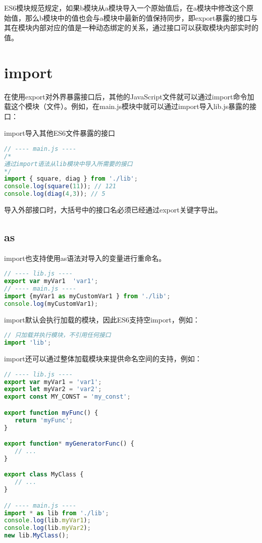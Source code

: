 ES6模块规范规定，如果b模块从a模块导入一个原始值后，在a模块中修改这个原始值，那么b模块中的值也会与a模块中最新的值保持同步，即export暴露的接口与其在模块内部对应的值是一种动态绑定的关系，通过接口可以获取模块内部实时的值。


\section{import}

在使用export对外界暴露接口后，其他的JavaScript文件就可以通过import命令加载这个模块（文件）。例如，在main.js模块中就可以通过import导入lib.js暴露的接口：


\begin{example}
import导入其他ES6文件暴露的接口
\begin{lstlisting}[language=JavaScript]
// ---- main.js ----
/* 
通过import语法从lib模块中导入所需要的接口
*/
import { square, diag } from './lib';
console.log(square(11)); // 121
console.log(diag(4,3)); // 5
\end{lstlisting}
\end{example}

导入外部接口时，大括号中的接口名必须已经通过export关键字导出。


\subsection{as}

import也支持使用as语法对导入的变量进行重命名。


\begin{lstlisting}[language=JavaScript]
// ---- lib.js ----
export var myVar1  'var1';
// ---- main.js ----
import {myVar1 as myCustomVar1 } from './lib';
console.log(myCustomVar1);
\end{lstlisting}

import默认会执行加载的模块，因此ES6支持空import，例如：


\begin{lstlisting}[language=JavaScript]
// 只加载并执行模块，不引用任何接口
import 'lib';
\end{lstlisting}

import还可以通过整体加载模块来提供命名空间的支持，例如：



\begin{lstlisting}[language=JavaScript]
// ---- lib.js ----
export var myVar1 = 'var1';
export let myVar2 = 'var2';
export const MY_CONST = 'my_const';

export function myFunc() {
   return 'myFunc';
}

export function* myGeneratorFunc() {
   // ...
}

export class MyClass {
   // ...
}

// ---- main.js ----
import * as lib from './lib';
console.log(lib.myVar1);
console.log(lib.myVar2);
new lib.MyClass();
\end{lstlisting}

